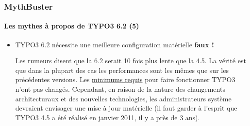 
\begin{frame}[fragile]
	\frametitle{MythBuster}
	\framesubtitle{Les mythes à propos de TYPO3 6.2 (5)}

	\begin{itemize}
		\item TYPO3 6.2 nécessite une meilleure configuration matérielle
			\tabto{9.2cm}\color{red}\textbf{\textrightarrow faux !}\color{black}

			\smaller
				Les rumeurs disent que la 6.2 serait 10 fois plus lente que la 4.5. La vérité est que dans la plupart des cas les performances sont les mêmes que sur les précédentes versions. Les \href{http://typo3.org/about/typo3-the-cms/system-requirements/}{minimums requis} pour faire fonctionner TYPO3 n'ont pas changés. Cependant, en raison de la nature des changements architecturaux et des nouvelles technologies, les administrateurs système devraient envisager une mise à jour matérielle (il faut garder à l'esprit que TYPO3 4.5 a été réalisé en janvier 2011, il y a près de 3 ans).
			\normalsize

	\end{itemize}

\end{frame}



